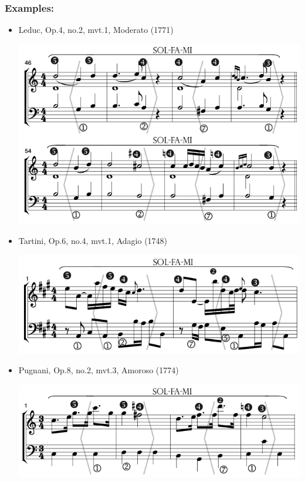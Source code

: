 \documentclass[11pt, openany]{article}
\begin{document}
\subsubsection{Examples:}
\begin{itemize}
\item Leduc, Op.4, no.2, mvt.1, Moderato (1771)
\begin{center}
\includegraphics[scale=0.5]{leduc4.png}
\end{center}
\item Tartini, Op.6, no.4, mvt.1, Adagio (1748)
\begin{center}
\includegraphics[scale=0.5]{tartini6.png}
\end{center}
\item Pugnani, Op.8, no.2, mvt.3, Amoroso (1774)
\begin{center}
\includegraphics[scale=0.5]{pugnani8.png}
\end{center}
\end{itemize}
\end{document}
